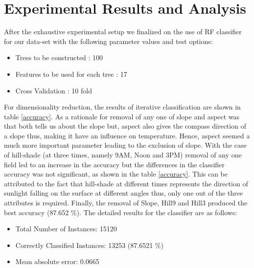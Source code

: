 \documentclass{llncs}
\begin{document}
\section{Experimental Results and Analysis}
After the exhaustive experimental setup we finalized on the use of RF classifier for our data-set with the following parameter values and test options:

\begin{itemize}
  \item Trees to be constructed : 100
  \item Features to be used for each tree : 17
  \item Cross Validation : 10 fold
\end{itemize}


For dimensionality reduction, the results of iterative classification are shown in table \ref{accuracy}. As a rationale for removal of any one of slope and aspect was that both tells us about the slope but, aspect also gives the compass direction of a slope thus, making it have an influence on temperature. Hence, aspect seemed a much more important parameter leading to the exclusion of slope. With the case of hill-shade (at three times, namely 9AM, Noon and 3PM) removal of any one field led to an increase in the accuracy but the differences in the classifier accuracy was not significant, as shown in the table \ref{accuracy}.
This can be attributed to the fact that hill-shade at different times represents the direction of sunlight falling on the surface at different angles thus, only one out of the three attributes is required. Finally, the removal of Slope, Hill9 and Hill3 produced the best accuracy (87.652 \%). The detailed results for the classifier are as follows:

\begin{itemize}
    \item Total Number of Instances: 15120 
    \item Correctly Classified Instances: 13253 (87.6521 \%)
    \item Mean absolute error: 0.0665
\end{itemize}
\end{document}
